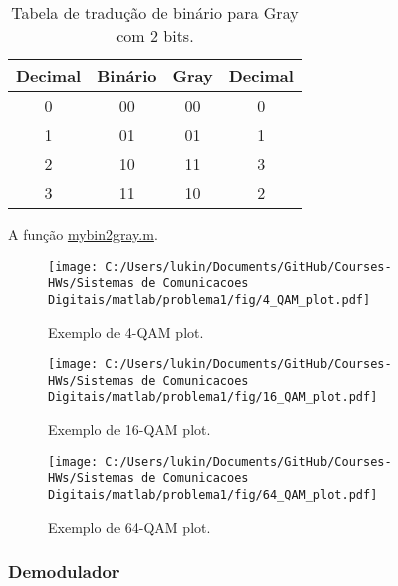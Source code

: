 \begin{table}[!ht]
    \centering
    \begin{tabular}{|c|c|c|c|}
        \hline
        Decimal & Binário & Gray & Decimal \\ \hline
        0 & 00 & 00 & 0\\ \hline
        1 & 01 & 01 & 1\\ \hline
        2 & 10 & 11 & 3\\ \hline
        3 & 11 & 10 & 2\\ \hline
    \end{tabular}
    \caption{Tabela de tradução de binário para Gray com 2 bits.}
    \label{tab:Alfabeto_Gray}
\end{table}

A função \href{https://raw.githubusercontent.com/lucasabdalah/Courses-HWs/SCD/Sistemas%20de%20Comunicacoes%20Digitais/matlab/mybin2gray.m}{mybin2gray.m}.

\begin{figure}[!ht]
    \centering
    \texttt{[image: C:/Users/lukin/Documents/GitHub/Courses-HWs/Sistemas de Comunicacoes Digitais/matlab/problema1/fig/4\_QAM\_plot.pdf]}
    \caption{Exemplo de 4-QAM plot.}
    \label{fig:4_QAM_plot}
\end{figure}

\clearpage

\begin{figure}[!ht]
    \centering
    \texttt{[image: C:/Users/lukin/Documents/GitHub/Courses-HWs/Sistemas de Comunicacoes Digitais/matlab/problema1/fig/16\_QAM\_plot.pdf]}
    \caption{Exemplo de 16-QAM plot.}
    \label{fig:16_QAM_plot}
\end{figure}

\begin{figure}[!ht]
    \centering
    \texttt{[image: C:/Users/lukin/Documents/GitHub/Courses-HWs/Sistemas de Comunicacoes Digitais/matlab/problema1/fig/64\_QAM\_plot.pdf]}
    \caption{Exemplo de 64-QAM plot.}
    \label{fig:64_QAM_plot}
\end{figure}

\clearpage

\subsubsection{Demodulador}


